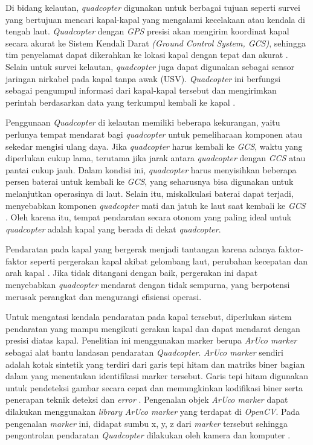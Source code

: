 Di bidang kelautan, \textit{quadcopter} digunakan untuk berbagai tujuan seperti survei yang bertujuan mencari kapal-kapal yang mengalami kecelakaan atau kendala di tengah laut. \textit{Quadcopter} dengan \textit{GPS} presisi akan mengirim koordinat kapal secara akurat ke Sistem Kendali Darat \textit{(Ground Control System, GCS)}, sehingga tim penyelamat dapat dikerahkan ke lokasi kapal dengan tepat dan akurat \citep{jeon2019real}. Selain untuk survei kelautan, \textit{quadcopter} juga dapat digunakan sebagai sensor jaringan nirkabel pada kapal tanpa awak (USV). \textit{Quadcopter} ini berfungsi sebagai pengumpul informasi dari kapal-kapal tersebut dan mengirimkan perintah berdasarkan data yang terkumpul kembali ke kapal \citep{hong2022efficient}.

Penggunaan \textit{Quadcopter} di kelautan memiliki beberapa kekurangan, yaitu perlunya tempat mendarat bagi \textit{quadcopter} untuk pemeliharaan komponen atau sekedar mengisi ulang daya. Jika \textit{quadcopter} harus kembali ke \textit{GCS}, waktu yang diperlukan cukup lama, terutama jika jarak antara \textit{quadcopter} dengan \textit{GCS} atau pantai cukup jauh. Dalam kondisi ini, \textit{quadcopter} harus menyisihkan beberapa persen baterai untuk kembali ke \textit{GCS}, yang seharusnya bisa digunakan untuk melanjutkan operasinya di laut. Selain itu, miskalkulasi baterai dapat terjadi, menyebabkan komponen \textit{quadcopter} mati dan jatuh ke laut saat kembali ke \textit{GCS} \citep{saha2011predicting}. Oleh karena itu, tempat pendaratan secara otonom yang paling ideal untuk \textit{quadcopter} adalah kapal yang berada di dekat \textit{quadcopter}.

Pendaratan pada kapal yang bergerak menjadi tantangan karena adanya faktor-faktor seperti pergerakan kapal akibat gelombang laut, perubahan kecepatan dan arah kapal \citep{hutauruk2013respons}. Jika tidak ditangani dengan baik, pergerakan ini dapat menyebabkan \textit{quadcopter} mendarat dengan tidak sempurna, yang berpotensi merusak perangkat dan mengurangi efisiensi operasi.

Untuk mengatasi kendala pendaratan pada kapal tersebut, diperlukan sistem pendaratan yang mampu mengikuti gerakan kapal dan dapat mendarat dengan presisi diatas kapal. Penelitian ini menggunakan marker berupa \textit{\textit{ArUco marker}} sebagai alat bantu landasan pendaratan \textit{Quadcopter}. \textit{ArUco marker} sendiri adalah kotak sintetik yang terdiri dari garis tepi hitam dan matriks biner bagian dalam yang menentukan identifikasi marker tersebut. Garis tepi hitam digunakan untuk pendeteksi gambar secara cepat dan memungkinkan kodifikasi biner serta penerapan teknik deteksi dan \textit{error} \citep{priambodo2022vision}. Pengenalan objek \textit{ArUco marker} dapat dilakukan menggunakan \textit{library} \textit{ArUco marker} yang terdapat di \textit{OpenCV}. Pada pengenalan \textit{marker} ini, didapat sumbu x, y, z dari \textit{marker} tersebut sehingga pengontrolan pendaratan \textit{Quadcopter} dilakukan oleh kamera dan komputer \citep{supriyanto2019sistem}.

